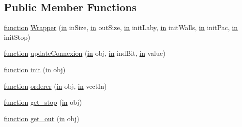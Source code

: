 \subsection*{Public Member Functions}
\begin{DoxyCompactItemize}
\item 
\hyperlink{_plan__desuma_functions_8m_ac2ffb26d6f42d3bbcd7847b0873403f4}{function} \hyperlink{class_wrapper_ab0ebf6c7738beb446d13d2d9445fbc8a}{Wrapper} (\hyperlink{class_wrapper_a5e252d97ca5bf85c5753e2914673eead}{in} in\+Size, \hyperlink{class_wrapper_a5e252d97ca5bf85c5753e2914673eead}{in} out\+Size, \hyperlink{class_wrapper_a5e252d97ca5bf85c5753e2914673eead}{in} init\+Laby, \hyperlink{class_wrapper_a5e252d97ca5bf85c5753e2914673eead}{in} init\+Walls, \hyperlink{class_wrapper_a5e252d97ca5bf85c5753e2914673eead}{in} init\+Pac, \hyperlink{class_wrapper_a5e252d97ca5bf85c5753e2914673eead}{in} init\+Stop)
\item 
\hyperlink{_plan__desuma_functions_8m_ac2ffb26d6f42d3bbcd7847b0873403f4}{function} \hyperlink{class_wrapper_aa41b9b215897635f48e1c8a4eaca7640}{update\+Connexion} (\hyperlink{class_wrapper_a5e252d97ca5bf85c5753e2914673eead}{in} obj, \hyperlink{class_wrapper_a5e252d97ca5bf85c5753e2914673eead}{in} ind\+Bit, \hyperlink{class_wrapper_a5e252d97ca5bf85c5753e2914673eead}{in} value)
\item 
\hyperlink{_plan__desuma_functions_8m_ac2ffb26d6f42d3bbcd7847b0873403f4}{function} \hyperlink{class_wrapper_a7d486dd79e7c7bc857ffaa4e273d27c5}{init} (\hyperlink{class_wrapper_a5e252d97ca5bf85c5753e2914673eead}{in} obj)
\item 
\hyperlink{_plan__desuma_functions_8m_ac2ffb26d6f42d3bbcd7847b0873403f4}{function} \hyperlink{class_wrapper_a9c889c73b9d4b80dde64dfe385ed747e}{orderer} (\hyperlink{class_wrapper_a5e252d97ca5bf85c5753e2914673eead}{in} obj, \hyperlink{class_wrapper_a5e252d97ca5bf85c5753e2914673eead}{in} vect\+In)
\item 
\hyperlink{_plan__desuma_functions_8m_ac2ffb26d6f42d3bbcd7847b0873403f4}{function} \hyperlink{class_wrapper_aaba4a98b8b3bf391348722f0f227e333}{get\+\_\+stop} (\hyperlink{class_wrapper_a5e252d97ca5bf85c5753e2914673eead}{in} obj)
\item 
\hyperlink{_plan__desuma_functions_8m_ac2ffb26d6f42d3bbcd7847b0873403f4}{function} \hyperlink{class_wrapper_a15af7c208437e3c98d1f130b45a36a37}{get\+\_\+out} (\hyperlink{class_wrapper_a5e252d97ca5bf85c5753e2914673eead}{in} obj)
\end{DoxyCompactItemize}

